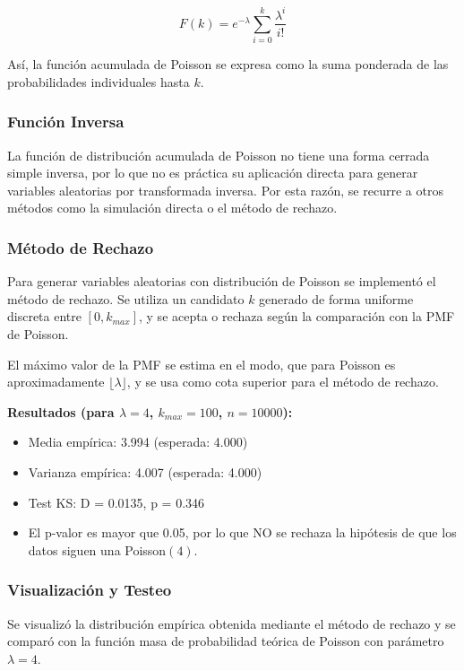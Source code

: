 \documentclass{article}
\begin{document}
\[
F(k) = e^{-\lambda} \sum_{i=0}^k \frac{\lambda^i}{i!}
\]

Así, la función acumulada de Poisson se expresa como la suma ponderada de las probabilidades individuales hasta \(k\).


\subsubsection*{Función Inversa}
La función de distribución acumulada de Poisson no tiene una forma cerrada simple inversa, por lo que no es práctica su aplicación directa para generar variables aleatorias por transformada inversa. Por esta razón, se recurre a otros métodos como la simulación directa o el método de rechazo.

\subsubsection{Método de Rechazo}

Para generar variables aleatorias con distribución de Poisson se implementó el método de rechazo. Se utiliza un candidato $k$ generado de forma uniforme discreta entre $[0, k_{max}]$, y se acepta o rechaza según la comparación con la PMF de Poisson.

El máximo valor de la PMF se estima en el modo, que para Poisson es aproximadamente $\lfloor \lambda \rfloor$, y se usa como cota superior para el método de rechazo.

\textbf{Resultados (para $\lambda=4$, $k_{max}=100$, $n=10000$):}
\begin{itemize}
    \item Media empírica: 3.994 (esperada: 4.000)
    \item Varianza empírica: 4.007 (esperada: 4.000)
    \item Test KS: D = 0.0135, p = 0.346
    \item El p-valor es mayor que 0.05, por lo que NO se rechaza la hipótesis de que los datos siguen una Poisson$(4)$.
\end{itemize}

\vspace{0.5em}
\subsubsection{Visualización y Testeo}

Se visualizó la distribución empírica obtenida mediante el método de rechazo y se comparó con la función masa de probabilidad teórica de Poisson con parámetro $\lambda=4$.
\end{document}
